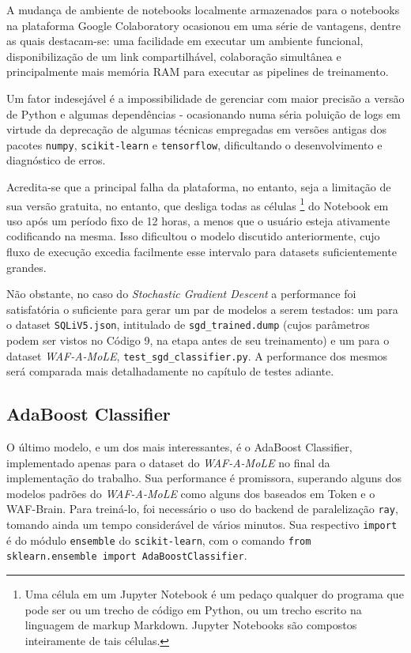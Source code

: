 A mudança de ambiente de notebooks localmente armazenados para o notebooks na plataforma Google Colaboratory ocasionou em uma série de vantagens, dentre as quais destacam-se: uma facilidade em executar um ambiente funcional, disponibilização de um link compartilhável, colaboração simultânea e principalmente mais memória RAM para executar as pipelines de treinamento. 

Um fator indesejável é a impossibilidade de gerenciar com maior precisão a versão de Python e algumas dependências - ocasionando numa séria poluição de logs em virtude da deprecação de algumas técnicas empregadas em versões antigas dos pacotes \verb+numpy+, \verb+scikit-learn+ e \verb+tensorflow+, dificultando o desenvolvimento e diagnóstico de erros. 

Acredita-se que a principal falha da plataforma, no entanto, seja a limitação de sua versão gratuita, no entanto, que desliga todas as células \footnote{Uma célula em um Jupyter Notebook é um pedaço qualquer do programa que pode ser ou um trecho de código em Python, ou um trecho escrito na linguagem de markup Markdown. Jupyter Notebooks são compostos inteiramente de tais células.} do Notebook em uso após um período fixo de 12 horas, a menos que o usuário esteja ativamente codificando na mesma. Isso dificultou o modelo discutido anteriormente, cujo fluxo de execução excedia facilmente esse intervalo para datasets suficientemente grandes.

Não obstante, no caso do \textit{Stochastic Gradient Descent} a performance foi satisfatória o suficiente para gerar um par de modelos a serem testados: um para o dataset \verb+SQLiV5.json+, intitulado de \verb+sgd_trained.dump+ (cujos parâmetros podem ser vistos no Código 9, na etapa antes de seu treinamento) e um para o dataset \textit{WAF-A-MoLE}, \verb+test_sgd_classifier.py+. A performance dos mesmos será comparada mais detalhadamente no capítulo de testes adiante. 

\label{sec:codigos:modelos}
\bigskip

\subsection{AdaBoost Classifier}

O último modelo, e um dos mais interessantes, é o AdaBoost Classifier, implementado apenas para o dataset do \textit{WAF-A-MoLE} no final da implementação do trabalho. Sua performance é promissora, superando alguns dos modelos padrões do \textit{WAF-A-MoLE} como alguns dos baseados em Token e o WAF-Brain. Para treiná-lo, foi necessário o uso do backend de paralelização \verb+ray+, tomando ainda um tempo considerável de vários minutos. Sua respectivo \verb+import+ é do módulo \verb+ensemble+ do \verb+scikit-learn+, com o comando \verb+from sklearn.ensemble import AdaBoostClassifier+. 

